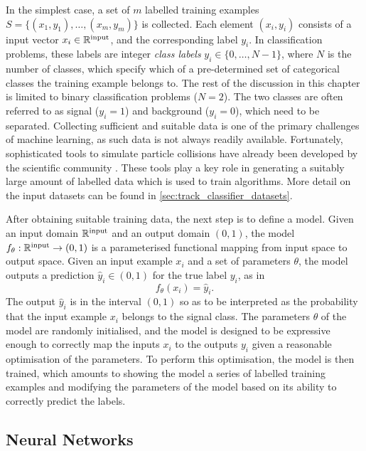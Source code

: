 In the simplest case, a set of $m$ labelled training examples $S = \{ (x_1, y_1) , \ldots , (x_m, y_m) \}$ is collected.
Each element $(x_i, y_i)$ consists of a input vector $x_i  \in \mathbb{R}^{\textnormal{input}}$, and the corresponding label $y_i$.
In classification problems, these labels are integer \textit{class labels} $y_i \in \{0,\ldots,N-1\}$, where $N$ is the number of classes, which specify which of a pre-determined set of categorical classes the training example belongs to.
The rest of the discussion in this chapter is limited to binary classification problems ($N = 2$).
The two classes are often referred to as signal ($y_i = 1$) and background ($y_i = 0$), which need to be separated.
Collecting sufficient and suitable data is one of the primary challenges of machine learning, as such data is not always readily available.
Fortunately, sophisticated tools to simulate particle collisions have already been developed by the scientific community \cite{Boos:2001cv,leshouchesstandardisation}.
These tools play a key role in generating a suitably large amount of labelled data which is used to train algorithms.
More detail on the input datasets can be found in \cref{sec:track_classifier_datasets}.

After obtaining suitable training data, the next step is to define a model.
Given an input domain $\mathbb{R}^{\textnormal{input}}$ and an output domain $(0, 1)$, the model
$f_\theta: \mathbb{R}^{\textnormal{input}} \to (0, 1)$ is a parameterised functional mapping from input space to output space.
Given an input example $x_i$ and a set of parameters $\theta$, the model outputs a prediction $\hat{y}_i \in (0, 1)$ for the true label $y_i$, as in
%
\begin{equation}
    f_\theta(x_i) = \hat{y}_i .
\end{equation}
%
The output $\hat{y}_i$ is in the interval $(0, 1)$ so as to be interpreted as the probability that the input example $x_i$ belongs to the signal class.
The parameters $\theta$ of the model are randomly initialised, and the model is designed to be expressive enough to correctly map the inputs $x_i$ to the outputs $y_i$ given a reasonable optimisation of the parameters.
To perform this optimisation, the model is then trained, which amounts to showing the model a series of labelled training examples and modifying the parameters of the model based on its ability to correctly predict the labels.


\subsection{Neural Networks}\label{sec:neural_nets}

